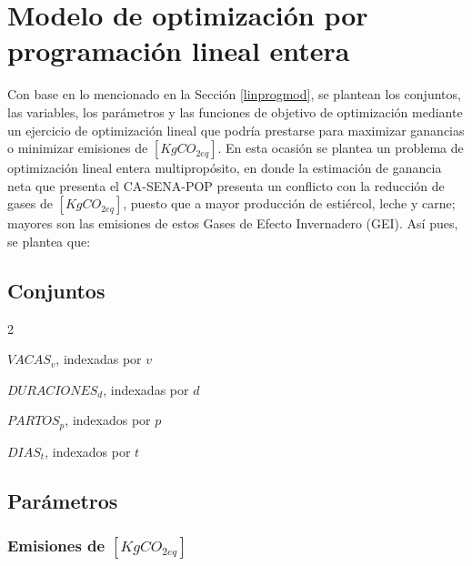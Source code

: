


\section{Modelo de optimización por programación lineal entera}

Con base en lo mencionado en la Sección \ref{linprogmod}, se plantean los conjuntos, las variables, los parámetros y las funciones de objetivo de optimización mediante un ejercicio de optimización lineal que podría prestarse para maximizar ganancias o minimizar emisiones de $[KgCO_{2eq}]$. En esta ocasión se plantea un problema de optimización lineal entera multipropósito, en donde la estimación de ganancia neta que presenta el CA-SENA-POP presenta un conflicto con la reducción de gases de $[KgCO_{2eq}]$, puesto que a mayor producción de estiércol, leche y carne; mayores son las emisiones de estos Gases de Efecto Invernadero (GEI). Así pues, se plantea que:

\subsection{Conjuntos}
\begin{itemize}
\begin{multicols}{2}
    \item $VACAS_{v}$, indexadas por $v$
    \item $DURACIONES_{d}$, indexadas por $d$
    \item $PARTOS_{p}$, indexados por $p$
    \item $DIAS_{t}$, indexados por $t$
\end{multicols}
\end{itemize}
\subsection{Parámetros}

\subsubsection{Emisiones de $[KgCO_{2eq}]$}

